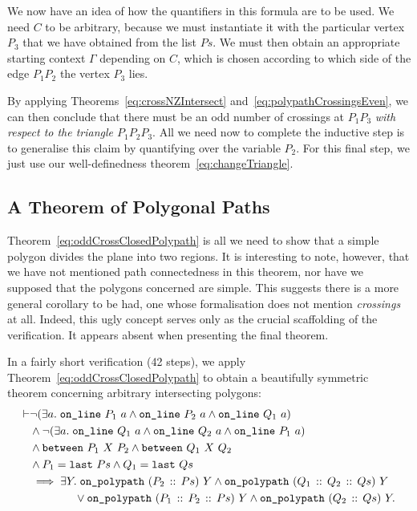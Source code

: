 We now have an idea of how the quantifiers in this formula are to be used. We need $C$ to be arbitrary, because we must instantiate it with the particular vertex $P_3$ that we have obtained from the list $Ps$. We must then obtain an appropriate starting context $\Gamma$ depending on $C$, which is chosen according to which side of the edge $P_1P_2$ the vertex $P_3$ lies. 

By applying Theorems~\ref{eq:crossNZIntersect} and~\ref{eq:polypathCrossingsEven}, we can then conclude that there must be an odd number of crossings at $P_1P_3$ \emph{with respect to the triangle $P_1P_2P_3$}. All we need now to complete the inductive step is to generalise this claim by quantifying over the variable $P_2$. For this final step, we just use our well-definedness theorem~\eqref{eq:changeTriangle}.

\subsection{A Theorem of Polygonal Paths}\label{sec:PathTheorem}
Theorem~\ref{eq:oddCrossClosedPolypath} is all we need to show that a simple polygon divides the plane into two regions. It is interesting to note, however, that we have not mentioned path connectedness in this theorem, nor have we supposed that the polygons concerned are simple. This suggests there is a more general corollary to be had, one whose formalisation does not mention \emph{crossings} at all. Indeed, this ugly concept serves only as the crucial scaffolding of the verification. It appears absent when presenting the final theorem.

In a fairly short verification (42 steps), we apply Theorem~\ref{eq:oddCrossClosedPolypath} to obtain a beautifully symmetric theorem concerning arbitrary intersecting polygons:
\begin{equation}\label{eq:intersectPolypathClosed}
  \begin{aligned}
    \vdash&\neg(\exists a.\; \texttt{on\_line}\ P_1\ a\wedge \texttt{on\_line}\ P_2\ a\wedge \texttt{on\_line}\ Q_1\ a)\\
    &\wedge\neg(\exists a.\; \texttt{on\_line}\ Q_1\ a\wedge \texttt{on\_line}\ Q_2\ a\wedge \texttt{on\_line}\ P_1\ a)\\
    &\wedge\texttt{between}\ P_1\ X\ P_2 \wedge \texttt{between}\ Q_1\ X\ Q_2\\
    &\wedge P_1 = \texttt{last}\ Ps \wedge Q_1 = \texttt{last}\ Qs\\
    &\implies \exists Y.\; \texttt{on\_polypath}\ (P_2\,::\,Ps)\ Y \wedge \texttt{on\_polypath}\ (Q_1\,::\,Q_2\,::\,Qs)\ Y\\
    &\qquad\qquad\vee \texttt{on\_polypath}\ (P_1\,::\,P_2\,::\,Ps)\ Y \wedge \texttt{on\_polypath}\ (Q_2\,::\,Qs)\ Y.
  \end{aligned}
\end{equation}

